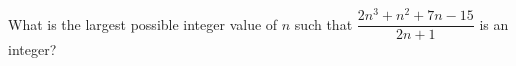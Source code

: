 What is the largest possible integer value of $n$ such that $\dfrac{2n^3+n^2+7n-15}{2n+1}$ is an integer?
